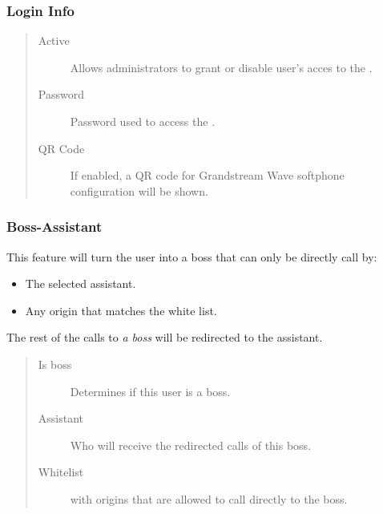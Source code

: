 \documentclass[letterpaper,10pt,english]{sphinxmanual}
\begin{document}
\subsubsection{Login Info}
\label{administration_portal/client/vpbx/users:login-info}\begin{quote}
\begin{description}
\item[{Active}] \leavevmode
Allows administrators to grant or disable user's acces to the
{\hyperref[user_portal/index:userportal]{}}.

\item[{Password}] \leavevmode
Password used to access the {\hyperref[user_portal/index:userportal]{}}.

\item[{QR Code}] \leavevmode
If enabled, a QR code for Grandstream Wave softphone configuration
will be shown.

\end{description}
\end{quote}


\subsubsection{Boss-Assistant}
\label{administration_portal/client/vpbx/users:boss-assistant}
This feature will turn the user into a boss that can only be directly call by:
\begin{itemize}
\item {} 
The selected assistant.

\item {} 
Any origin that matches the white list.

\end{itemize}

The rest of the calls to \emph{a boss} will be redirected to the assistant.
\begin{quote}
\begin{description}
\item[{Is boss}] \leavevmode
Determines if this user is a boss.

\item[{Assistant}] \leavevmode
Who will receive the redirected calls of this boss.

\item[{Whitelist}] \leavevmode
{\hyperref[administration_portal/client/vpbx/routing_tools/match_lists:match\string-lists]{}} with origins that are allowed to call directly to
the boss.

\end{description}
\end{quote}
\end{document}
